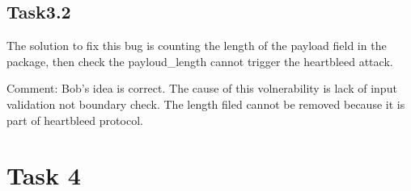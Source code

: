 \documentclass[onecolumn,oneside]{SUSTechHomework}
\begin{document}
\subsection*{Task3.2}

The solution to fix this bug is counting the length of the payload field in the package, then check the payloud\_length cannot trigger the heartbleed attack.

Comment: Bob's idea is correct. The cause of this volnerability is lack of input validation not boundary check. The length filed cannot be removed because it is part of heartbleed protocol.

\section*{Task 4}
\end{document}
